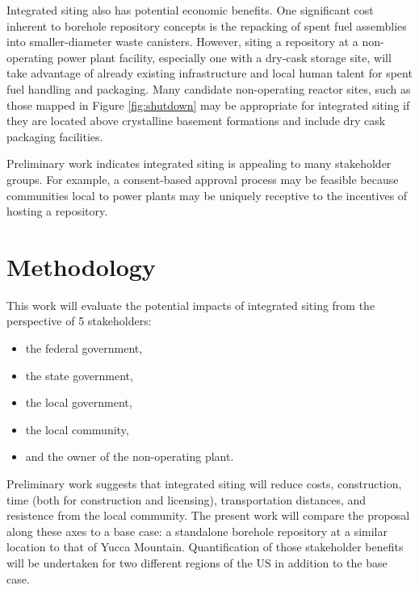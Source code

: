 Integrated siting also has potential economic benefits. One 
significant cost inherent to borehole repository concepts is the repacking of 
spent fuel assemblies into smaller-diameter waste canisters. However, siting a 
repository at a non-operating power plant facility, especially one with a 
dry-cask storage site, will take advantage of already existing infrastructure 
and local human talent for spent fuel handling and packaging. Many candidate 
non-operating reactor sites, such as those mapped in Figure \ref{fig:shutdown} 
may be appropriate for integrated siting if they are located above crystalline 
basement formations and include dry cask packaging facilities.


Preliminary work \cite{waleed_regional_2015} indicates integrated siting is 
appealing to many stakeholder groups. For example, a consent-based approval 
process may be feasible because communities local to power plants may be uniquely 
receptive to the incentives of hosting a repository.  


\section{Methodology}

This work will evaluate the potential impacts of integrated siting from the 
perspective of 5 stakeholders:
\begin{itemize}
        \item the federal government,
        \item the state government,
        \item the local government,
        \item the local community,
        \item and the owner of the non-operating plant.
\end{itemize}


Preliminary work \cite{waleed_regional_2015} suggests that integrated siting 
will reduce costs, construction, time (both for construction and licensing), 
transportation distances, and resistence from the local community.  The present 
work will compare the proposal along these axes to a base case: a standalone 
borehole repository at a similar location to that of Yucca Mountain.  
Quantification of those stakeholder benefits will be undertaken for two 
different regions of the US in addition to the base case.  

